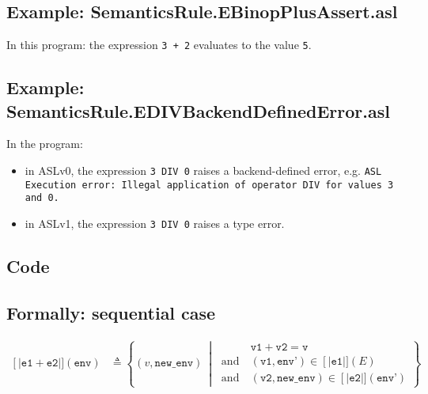 \documentclass{book}
\newcommand\llbracket{[|}
\newcommand\rrbracket{|]}
\newcommand\interp[1]{\left\llbracket #1 \right\rrbracket}
\newcommand\st[0]{\ \middle|\ }
\begin{document}
  \subsection{Example: SemanticsRule.EBinopPlusAssert.asl}
    In this program:
    the expression \texttt{3 + 2} evaluates to the value \texttt{5}.

  \subsection{Example: SemanticsRule.EDIVBackendDefinedError.asl}
    In the program:
    \begin{itemize}
    \item in ASLv0, the expression \texttt{3 DIV 0} raises a backend-defined
      error, e.g.
      \texttt{ASL Execution error: Illegal application of operator DIV for values 3 and 0.}
    \item in ASLv1, the expression \texttt{3 DIV 0} raises a type error.
    \end{itemize}

  \subsection{Code}

  \subsection{Formally: sequential case}
  
  \begin{align}
  \interp{\texttt{e1} + \texttt{e2}} (\texttt{env}) & \triangleq
    \left\{ (v, \texttt{new\_env}) \st{}
    \begin{aligned}
      & \texttt{v1} + \texttt{v2} = \texttt{v}
      \\ \text{and}\ &
      (\texttt{v1}, \texttt{env'}) \in{} \interp{\texttt{e1}} (E)
      \\ \text{and}\ &
      (\texttt{v2}, \texttt{new\_env}) \in{} \interp{\texttt{e2}} (\texttt{env'})
    \end{aligned}
    \right\}
  \label{eq:sem-seq-plus}
  \end{align} 
\end{document}
